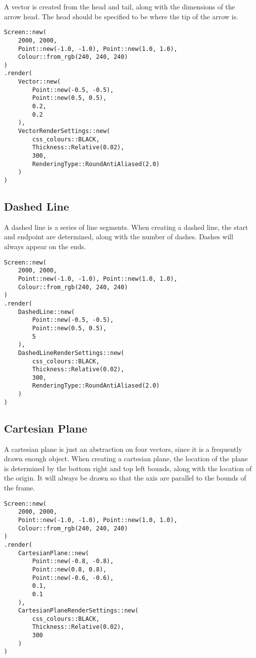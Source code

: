 A vector is created from the head and tail, along with the dimensions of the arrow head. The head should be specified to be where the tip of the arrow is.

\begin{lstlisting}
Screen::new(
    2000, 2000,
    Point::new(-1.0, -1.0), Point::new(1.0, 1.0),
    Colour::from_rgb(240, 240, 240)
)
.render(
    Vector::new(
        Point::new(-0.5, -0.5),
        Point::new(0.5, 0.5),
        0.2,
        0.2
    ),
    VectorRenderSettings::new(
        css_colours::BLACK,
        Thickness::Relative(0.02),
        300,
        RenderingType::RoundAntiAliased(2.0)
    )
)
\end{lstlisting}


\subsection{Dashed Line}

A dashed line is a series of line segments. When creating a dashed line, the start and endpoint are determined, along with the number of dashes. Dashes will always appear on the ends.

\begin{lstlisting}
Screen::new(
    2000, 2000,
    Point::new(-1.0, -1.0), Point::new(1.0, 1.0),
    Colour::from_rgb(240, 240, 240)
)
.render(
    DashedLine::new(
        Point::new(-0.5, -0.5),
        Point::new(0.5, 0.5),
        5
    ),
    DashedLineRenderSettings::new(
        css_colours::BLACK,
        Thickness::Relative(0.02),
        300,
        RenderingType::RoundAntiAliased(2.0)
    )
)
\end{lstlisting}


\subsection{Cartesian Plane}

A cartesian plane is just an abstraction on four vectors, since it is a frequently drawn enough object. When creating a cartesian plane, the location of the plane is determined by the bottom right and top left bounds, along with the location of the origin. It will always be drawn so that the axis are parallel to the bounds of the frame.

\begin{lstlisting}
Screen::new(
    2000, 2000,
    Point::new(-1.0, -1.0), Point::new(1.0, 1.0),
    Colour::from_rgb(240, 240, 240)
)
.render(
    CartesianPlane::new(
        Point::new(-0.8, -0.8),
        Point::new(0.8, 0.8),
        Point::new(-0.6, -0.6),
        0.1,
        0.1
    ),
    CartesianPlaneRenderSettings::new(
        css_colours::BLACK,
        Thickness::Relative(0.02),
        300
    )
)
\end{lstlisting}

